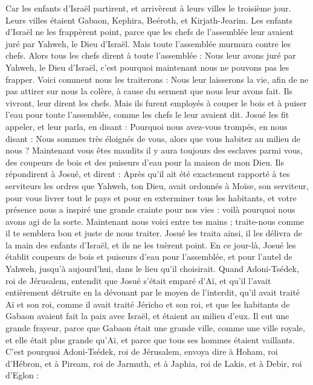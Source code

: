\begin{multicols}{2}
Car les enfants d’Israël partirent, et arrivèrent à leurs villes le troisième jour. Leurs villes étaient Gabaon, Kephira, Beéroth, et Kirjath-Jearim.
Les enfants d’Israël ne les frappèrent point, parce que les chefs de l’assemblée leur avaient juré par Yahweh, le Dieu d’Israël. Mais toute l’assemblée murmura contre les chefs.
Alors tous les chefs dirent à toute l’assemblée : Nous leur avons juré par Yahweh, le Dieu d’Israël, c’est pourquoi maintenant nous ne pouvons pas les frapper.
Voici comment nous les traiterons : Nous leur laisserons la vie, afin de ne pas attirer sur nous la colère, à cause du serment que nous leur avons fait.
Ils vivront, leur dirent les chefs. Mais ils furent employés à couper le bois et à puiser l’eau pour toute l’assemblée, comme les chefs le leur avaient dit\FTNT{}.
Josué les fit appeler, et leur parla, en disant : Pourquoi nous avez-vous trompés, en nous disant : Nous sommes très éloignés de vous, alors que vous habitez au milieu de nous ?
Maintenant vous êtes maudits il y aura toujours des esclaves parmi vous, des coupeurs de bois et des puiseurs d’eau pour la maison de mon Dieu.
Ils répondirent à Josué, et dirent : Après qu’il ait été exactement rapporté à tes serviteurs les ordres que Yahweh, ton Dieu, avait ordonnés à Moïse, son serviteur, pour vous livrer tout le pays et pour en exterminer tous les habitants, et votre présence nous a inspiré une grande crainte pour nos vies : voilà pourquoi nous avons agi de la sorte.
Maintenant nous voici entre tes mains ; traite-nous comme il te semblera bon et juste de nous traiter.
Josué les traita ainsi, il les délivra de la main des enfants d’Israël, et ils ne les tuèrent point.
En ce jour-là, Josué les établit coupeurs de bois et puiseurs d’eau pour l’assemblée, et pour l’autel de Yahweh, jusqu’à aujourd’hui, dans le lieu qu’il choisirait.
\VerseOne{}Quand Adoni-Tsédek, roi de Jérusalem, entendit que Josué s’était emparé d’Aï, et qu’il l’avait entièrement détruite en la dévouant par le moyen de l'interdit, qu’il avait traité Aï et son roi, comme il avait traité Jéricho et son roi, et que les habitants de Gabaon avaient fait la paix avec Israël, et étaient au milieu d’eux.
Il eut une grande frayeur, parce que Gabaon était une grande ville, comme une ville royale, et elle était plus grande qu’Aï, et parce que tous ses hommes étaient vaillants.
C’est pourquoi Adoni-Tsédek, roi de Jérusalem, envoya dire à Hoham, roi d’Hébron, et à Piream, roi de Jarmuth, et à Japhia, roi de Lakis, et à Debir, roi d’Eglon :

\end{multicols}
